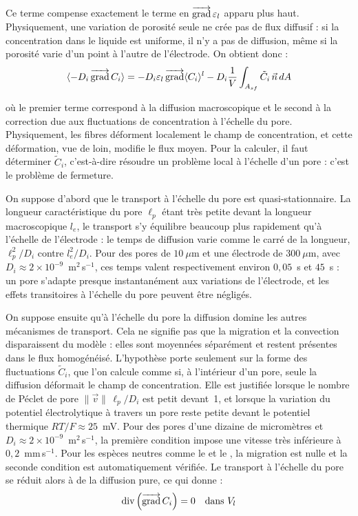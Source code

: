 Ce terme compense exactement le terme en $\mathop{\overrightarrow{\operatorname{grad}}}\nolimits\varepsilon_l$ apparu plus
haut. Physiquement, une variation de porosité seule ne crée pas de flux
diffusif : si la concentration dans le liquide est uniforme, il n'y a pas de
diffusion, même si la porosité varie d'un point à l'autre de l'électrode.
On obtient donc :
\begin{equation}
\langle -D_i \mathop{\overrightarrow{\operatorname{grad}}}\nolimits C_i \rangle = -D_i \varepsilon_l \mathop{\overrightarrow{\operatorname{grad}}}\nolimits\langle C_i \rangle^l
- D_i \frac{1}{V}\int_{A_{sf}} \tilde{C}_i\,\vec{n}\, dA
\end{equation}

où le premier terme correspond à la diffusion macroscopique et le second
à la correction due aux fluctuations de concentration à l'échelle du pore.
Physiquement, les fibres déforment localement le champ de concentration, et
cette déformation, vue de loin, modifie le flux moyen. Pour la calculer, il
faut déterminer $\tilde{C}_i$, c'est-à-dire résoudre un problème local à
l'échelle d'un pore : c'est le problème de fermeture.

On suppose d'abord que le transport à l'échelle du pore est
quasi-stationnaire. La longueur caractéristique du pore $\ell_p$ étant très
petite devant la longueur macroscopique $l_e$, le transport s'y équilibre
beaucoup plus rapidement qu'à l'échelle de l'électrode : le temps de diffusion
varie comme le carré de la longueur, $\ell_p^2/D_i$ contre $l_e^2/D_i$. Pour
des pores de $10~\mu$m et une électrode de $300~\mu$m, avec
$D_i \approx 2\times10^{-9}$~m$^2$\,s$^{-1}$, ces temps valent
respectivement environ $0{,}05$~s et $45$~s : un pore s'adapte presque
instantanément aux variations de l'électrode, et les effets transitoires à
l'échelle du pore peuvent être négligés.

On suppose ensuite qu'à l'échelle du pore la diffusion domine les autres
mécanismes de transport. Cela ne signifie pas que la migration et la
convection disparaissent du modèle : elles sont moyennées séparément et
restent présentes dans le flux homogénéisé. L'hypothèse porte seulement sur
la forme des fluctuations $\tilde{C}_i$, que l'on calcule comme si, à
l'intérieur d'un pore, seule la diffusion déformait le champ de
concentration. Elle est justifiée lorsque le nombre de Péclet de pore
$\|\vec{v}\|\,\ell_p/D_i$ est petit devant~1, et lorsque la variation du
potentiel électrolytique à travers un pore reste petite devant le potentiel
thermique $RT/F \approx 25$~mV. Pour des pores d'une dizaine de micromètres et
$D_i \approx 2\times10^{-9}$~m$^2$\,s$^{-1}$, la première condition impose une
vitesse très inférieure à $0{,}2$~mm\,s$^{-1}$. Pour les espèces neutres comme
le  et le , la migration est nulle et la seconde condition est
automatiquement vérifiée. Le transport à l'échelle du pore se réduit alors à
de la diffusion pure, ce qui donne :
\begin{equation}
\operatorname{div}\left(\mathop{\overrightarrow{\operatorname{grad}}}\nolimits C_i\right) = 0 \quad \text{dans } V_l
\end{equation}

